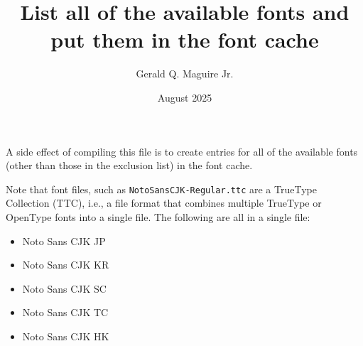 \documentclass{article}
\title{List all of the available fonts and put them in the font cache}
\author{Gerald Q. Maguire Jr.}
\date{August 2025}
\newcommand{\fname}[1]{\texttt{#1}}
\begin{document}
\maketitle

A side effect of compiling this file is to create entries for all of the available fonts (other than those in the exclusion list) in the font cache.

Note that font files, such as \fname{NotoSansCJK-Regular.ttc} are a TrueType Collection (TTC), i.e., a file format that combines multiple TrueType or OpenType fonts into a single file. The following are all in a single file:
\begin{itemize}
    \item Noto Sans CJK JP
    \item Noto Sans CJK KR
    \item Noto Sans CJK SC
    \item Noto Sans CJK TC
    \item Noto Sans CJK HK
\end{itemize}
\end{document}
